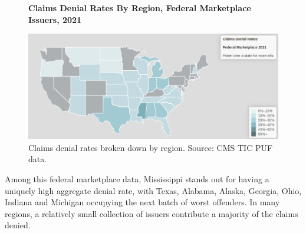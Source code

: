 \documentclass[psamsfonts]{amsart}
\theoremstyle{plain}
\theoremstyle{definition}
\theoremstyle{remark}
\begin{document}
\begin{figure}
	\centering
	\textbf{Claims Denial Rates By Region, Federal Marketplace Issuers, 2021}\par\medskip
	\includegraphics[width=0.85\columnwidth]{images/cms_puf/federal_denial_rates.png}
	\caption{Claims denial rates broken down by region. Source: CMS TIC PUF data.}
	\label{federal_denial_map}
\end{figure}

Among this federal marketplace data, Mississippi stands out for having a uniquely high aggregate denial rate, with Texas, Alabama, Alaska, Georgia, Ohio, Indiana and Michigan occupying the next batch of worst offenders. In many regions, a relatively small collection of issuers contribute a majority of the claims denied.\\
\end{document}
